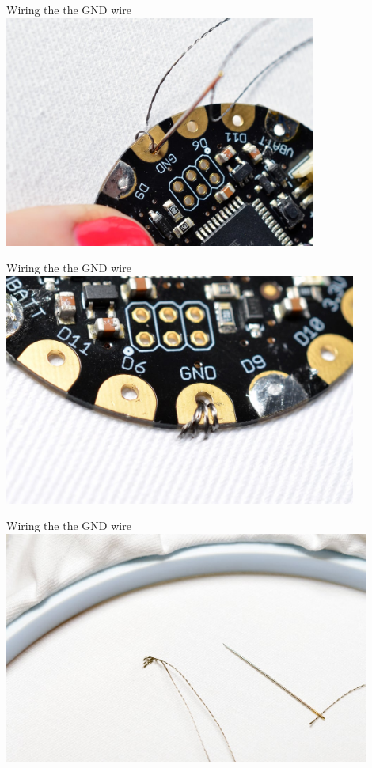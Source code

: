 \documentclass{beamer}
\begin{document}
\begin{frame}[fragile]{Wiring the the GND wire}
\includegraphics[height=3in]{flora_DSC_0103.jpg}
\end{frame}
\begin{frame}[fragile]{Wiring the the GND wire}
\includegraphics[height=3in]{flora_DSC_0105.jpg}
\end{frame}
\begin{frame}[fragile]{Wiring the the GND wire}
\includegraphics[height=3in]{flora_DSC_0106.jpg}
\end{frame}
\end{document}
